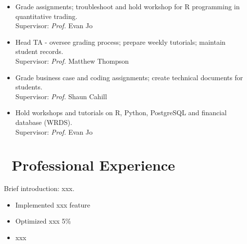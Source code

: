 \documentclass{resume}
\begin{document}
\begin{itemize}
  \item {}
  {Grade assignments; troubleshoot and hold workshop for R programming in quantitative trading.}\\
  {Supervisor: \emph{Prof.} Evan Jo}\\
  \vspace{-0.5em}
  
  \item {}
  {Head TA - oversee grading process; prepare weekly tutorials; maintain student records.}\\
  {Supervisor: \emph{Prof.} Matthew Thompson}\\
  \vspace{-0.5em}
  
  \item {}
  {Grade business case and coding assignments; create technical documents for students.}\\
  {Supervisor: \emph{Prof.} Shaun Cahill}\\
  \vspace{-0.5em}
  
  \item {}
  {Hold workshops and tutorials on R, Python, PostgreSQL and financial database (WRDS).}\\
  {Supervisor: \emph{Prof.} Evan Jo}
\end{itemize}


\section{\faIndustry\ Professional Experience}
Brief introduction: xxx.
\begin{itemize}
  \item Implemented xxx feature
  \item Optimized xxx 5\%
  \item xxx
\end{itemize}

\end{document}
